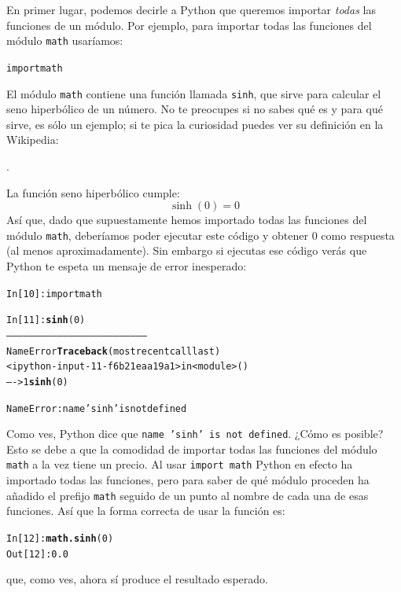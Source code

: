 \documentclass[10pt,a4paper]{article}\usepackage[]{graphicx}\usepackage[]{color}
\makeatletter
\newcommand{\hlnum}[1]{\textcolor[rgb]{0.686,0.059,0.569}{#1}}%
\newcommand{\hlstr}[1]{\textcolor[rgb]{0.192,0.494,0.8}{#1}}%
\newcommand{\hlopt}[1]{\textcolor[rgb]{0,0,0}{#1}}%
\newcommand{\hlstd}[1]{\textcolor[rgb]{0.345,0.345,0.345}{#1}}%
\newcommand{\hlkwd}[1]{\textcolor[rgb]{0.737,0.353,0.396}{\textbf{#1}}}%
\newenvironment{kframe}{%
 \def\at@end@of@kframe{}%
 \ifinner\ifhmode%
  \def\at@end@of@kframe{\end{minipage}}%
  \begin{minipage}{\columnwidth}%
 \fi\fi%
 \def\FrameCommand##1{\hskip\@totalleftmargin \hskip-\fboxsep
 \colorbox{shadecolor}{##1}\hskip-\fboxsep
     \hskip-\linewidth \hskip-\@totalleftmargin \hskip\columnwidth}%
 \MakeFramed {\advance\hsize-\width
   \@totalleftmargin\z@ \linewidth\hsize
   \@setminipage}}%
 {\par\unskip\endMakeFramed%
 \at@end@of@kframe}
\newenvironment{knitrout}{}{} %
\newcounter {cont01}
\makeatother
\begin{document}
En primer lugar, podemos decirle a Python que queremos importar {\em todas} las funciones de un módulo. Por ejemplo, para importar todas las funciones del módulo {\tt math} usaríamos:
\begin{knitrout}
\color{fgcolor}\begin{kframe}
\begin{alltt}
import math
\end{alltt}
\end{kframe}
\end{knitrout}
El módulo {\tt math} contiene una función llamada {\tt sinh}, que sirve para calcular el seno hiperbólico de un número. No te preocupes si no sabes qué es y para qué sirve, es sólo un ejemplo; si te pica la curiosidad puedes ver su definición en la Wikipedia:
\begin{center}
.
\end{center}
La función seno hiperbólico cumple:
$$\sinh(0) = 0$$
Así que, dado que supuestamente  hemos importado todas las funciones del módulo {\tt math}, deberíamos poder ejecutar este código y obtener 0 como respuesta (al menos aproximadamente).
Sin embargo si ejecutas ese código verás que Python te espeta un mensaje de error inesperado:
\begin{knitrout}
\color{fgcolor}\begin{kframe}
\begin{alltt}
In [10]: import math

In [11]: \hlkwd{sinh}(0)
---------------------------------------------------------------------------
NameError                                 \hlkwd{Traceback} (most recent call last)
<ipython-input-11-f6b21eaa19a1> in <module>()
----> 1 \hlkwd{sinh}(0)

NameError: name \hlstr{'sinh'} is not defined
\end{alltt}
\end{kframe}
\end{knitrout}
Como ves, Python dice que {\tt name 'sinh' is not defined}. ¿Cómo es posible? Esto se debe a que la comodidad de importar todas las funciones del módulo {\tt math} a la vez tiene un precio. Al usar {\tt import math} Python en efecto ha importado todas las funciones, pero para saber de qué módulo proceden ha añadido el prefijo {\tt math} seguido de un punto al nombre de cada una de esas funciones. Así que la forma correcta de usar la función es:
\begin{knitrout}
\color{fgcolor}\begin{kframe}
\begin{alltt}
\hlstd{In [}\hlnum{12}\hlstd{]}\hlopt{:} \hlkwd{math.sinh}\hlstd{(}\hlnum{0}\hlstd{)}
\hlstd{Out[}\hlnum{12}\hlstd{]}\hlopt{:} \hlnum{0.0}
\end{alltt}
\end{kframe}
\end{knitrout}
que, como ves, ahora sí produce el resultado esperado.
\end{document}
